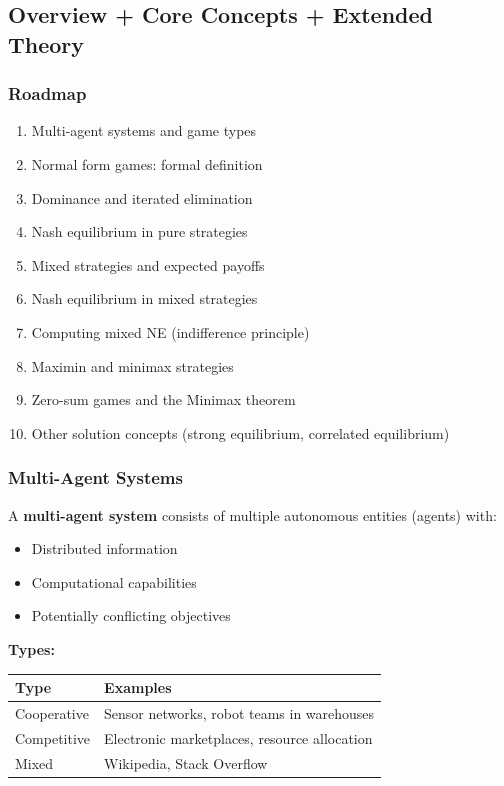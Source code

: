 \separator

\subsection{Overview + Core Concepts + Extended Theory}

\subsubsection*{Roadmap}
\begin{enumerate}
  \item Multi-agent systems and game types
  \item Normal form games: formal definition
  \item Dominance and iterated elimination
  \item Nash equilibrium in pure strategies
  \item Mixed strategies and expected payoffs
  \item Nash equilibrium in mixed strategies
  \item Computing mixed NE (indifference principle)
  \item Maximin and minimax strategies
  \item Zero-sum games and the Minimax theorem
  \item Other solution concepts (strong equilibrium, correlated equilibrium)
\end{enumerate}

\bigseparator

\subsubsection{Multi-Agent Systems}

\begin{defbox}
A \textbf{multi-agent system} consists of multiple autonomous entities (agents) with:
\begin{itemize}
  \item Distributed information
  \item Computational capabilities
  \item Potentially conflicting objectives
\end{itemize}

\textbf{Types:}
\begin{center}
\renewcommand{\arraystretch}{1.3}
\begin{tabular}{@{} l p{8cm} @{}}
\toprule
\textbf{Type} & \textbf{Examples} \\
\midrule
Cooperative & Sensor networks, robot teams in warehouses \\
Competitive & Electronic marketplaces, resource allocation \\
Mixed & Wikipedia, Stack Overflow \\
\bottomrule
\end{tabular}
\end{center}
\end{defbox}

